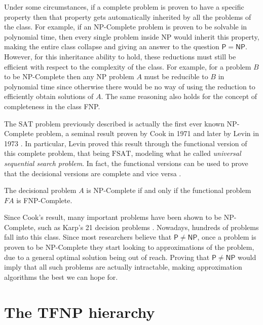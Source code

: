 Under some circumstances, if a complete problem is proven to have a specific property then that property gets automatically inherited by all the problems of the class. For example, if an \textsf{NP}-Complete problem is proven to be solvable in polynomial time, then every single problem inside \textsf{NP} would inherit this property, making the entire class collapse and giving an answer to the question $\mathsf{P} = \mathsf{NP}$. However, for this inheritance ability to hold, these reductions must still be efficient with respect to the complexity of the class. For example, for a problem $B$ to be \textsf{NP}-Complete then any \textsf{NP} problem $A$ must be reducible to $B$ in polynomial time since otherwise there would be no way of using the reduction to efficiently obtain solutions of $A$. The same reasoning also holds for the concept of completeness in the class \textsf{FNP}.

The $\mathrm{SAT}$ problem previously described is actually the first ever known \textsf{NP}-Complete problem, a seminal result proven by Cook in 1971 \cite{cook_sat} and later by Levin in 1973 \cite{levin_fsat}. In particular, Levin proved this result through the functional version of this complete problem, that being $\mathrm{FSAT}$, modeling what he called \textit{universal sequential search problem}. In fact, the functional versions can be used to prove that the decisional versions are complete and vice versa \cite{rel_comp_np_search}.

\begin{theorem}
 The decisional problem $A$ is \textsf{NP}-Complete if and only if the functional problem $FA$ is \textsf{FNP}-Complete.
\end{theorem}

Since Cook's result, many important problems have been shown to be \textsf{NP}-Complete, such as Karp's 21 decision problems \cite{karp}. Nowadays, hundreds of problems fall into this class. Since most researchers believe that $\mathsf{P} \neq \mathsf{NP}$, once a problem is proven to be \textsf{NP}-Complete they start looking to approximations of the problem, due to a general optimal solution being out of reach. Proving that $\mathsf{P} \neq \mathsf{NP}$ would imply that all such problems are actually intractable, making approximation algorithms the best we can hope for.

\section{The \textsf{TFNP} hierarchy}

